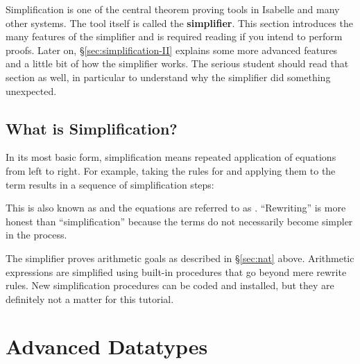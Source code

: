 Simplification is one of the central theorem proving tools in Isabelle and
many other systems. The tool itself is called the \textbf{simplifier}. 
This section introduces the many features of the simplifier
and is required reading if you intend to perform proofs.  Later on,
{\S}\ref{sec:simplification-II} explains some more advanced features and a
little bit of how the simplifier works. The serious student should read that
section as well, in particular to understand why the simplifier did
something unexpected.

\subsection{What is Simplification?}

In its most basic form, simplification means repeated application of
equations from left to right. For example, taking the rules for \isa{\at}
and applying them to the term \isa{[0,1] \at\ []} results in a sequence of
simplification steps:
This is also known as  and the
equations are referred to as .
``Rewriting'' is more honest than ``simplification'' because the terms do not
necessarily become simpler in the process.

The simplifier proves arithmetic goals as described in
{\S}\ref{sec:nat} above.  Arithmetic expressions are simplified using built-in
procedures that go beyond mere rewrite rules.  New simplification procedures
can be coded and installed, but they are definitely not a matter for this
tutorial. 





\begin{exercise}
%
\end{exercise}
\begin{exercise}
%
\end{exercise}




\section{Advanced Datatypes}
\label{sec:advanced-datatypes}


